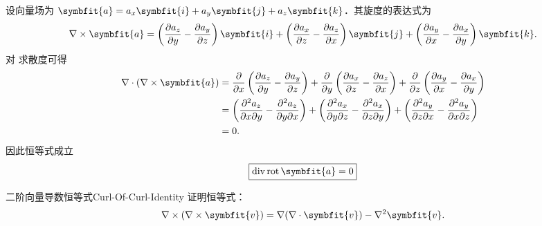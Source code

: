 \begin{myproof}
    设向量场为 $\symbfit{a} = a_x \symbfit{i} + a_y \symbfit{j} + a_z \symbfit{k}$．其旋度的表达式为
    \begin{equation}\label{eq:curl-def}
        \nabla \times \symbfit{a} = \left( \frac{\partial a_z}{\partial y} - \frac{\partial a_y}{\partial z} \right) \symbfit{i} + \left( \frac{\partial a_x}{\partial z} - \frac{\partial a_z}{\partial x} \right) \symbfit{j} + \left( \frac{\partial a_y}{\partial x} - \frac{\partial a_x}{\partial y} \right) \symbfit{k}.
    \end{equation}
    对  求散度可得
    \begin{equation}\label{eq:div-rot-calc}
        \begin{aligned}
            \nabla \cdot (\nabla \times \symbfit{a}) & = \frac{\partial}{\partial x} \left( \frac{\partial a_z}{\partial y} - \frac{\partial a_y}{\partial z} \right) + \frac{\partial}{\partial y} \left( \frac{\partial a_x}{\partial z} - \frac{\partial a_z}{\partial x} \right) + \frac{\partial}{\partial z} \left( \frac{\partial a_y}{\partial x} - \frac{\partial a_x}{\partial y} \right) \\
                                                     & = \left( \frac{\partial^2 a_z}{\partial x \partial y} - \frac{\partial^2 a_z}{\partial y \partial x} \right) + \left( \frac{\partial^2 a_x}{\partial y \partial z} - \frac{\partial^2 a_x}{\partial z \partial y} \right) + \left( \frac{\partial^2 a_y}{\partial z \partial x} - \frac{\partial^2 a_y}{\partial x \partial z} \right)       \\
                                                     & = 0.
        \end{aligned}
    \end{equation}
    因此恒等式成立
    \begin{equation}\label{eq:div-rot-final}
        \boxed{\operatorname{div} \operatorname{rot} \symbfit{a} = 0}
    \end{equation}
\end{myproof}


\begin{problem}{二阶向量导数恒等式}{Curl-Of-Curl-Identity}
    证明恒等式：
    \begin{equation*}
        \nabla \times (\nabla \times \symbfit{v}) = \nabla (\nabla \cdot \symbfit{v}) - \nabla^2 \symbfit{v}.
    \end{equation*}
\end{problem}

